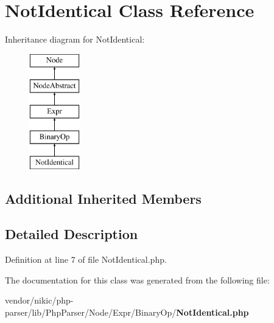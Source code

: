 \section{Not\+Identical Class Reference}
\label{class_php_parser_1_1_node_1_1_expr_1_1_binary_op_1_1_not_identical}
Inheritance diagram for Not\+Identical\+:\begin{figure}[H]
\begin{center}
\leavevmode
\includegraphics[height=5.000000cm]{class_php_parser_1_1_node_1_1_expr_1_1_binary_op_1_1_not_identical}
\end{center}
\end{figure}
\subsection*{Additional Inherited Members}


\subsection{Detailed Description}


Definition at line 7 of file Not\+Identical.\+php.



The documentation for this class was generated from the following file\+:\begin{DoxyCompactItemize}
\item 
vendor/nikic/php-\/parser/lib/\+Php\+Parser/\+Node/\+Expr/\+Binary\+Op/{\bf Not\+Identical.\+php}\end{DoxyCompactItemize}
